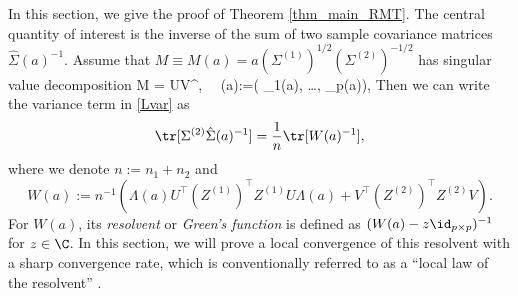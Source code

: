 \documentclass[aos,preprint]{imsart}
\begin{document}
In this section, we give the proof of Theorem \ref{thm_main_RMT}. The central quantity of interest is the inverse of the sum of two sample covariance matrices $\hat \Sigma(a)^{-1}$. Assume that $M\equiv M(a)=a(\Sigma^{(1)})^{1/2}(\Sigma^{(2)})^{-1/2}$ has singular value decomposition
\be\label{eigen2}
M = U\Lambda V^\top, \quad {} \ \ \Lambda\equiv \Lambda (a):=( \lambda_1(a), \ldots, \lambda_p(a)),
\ee 
Then we can write the variance term in \eqref{Lvar} as
\begin{align}\label{eigen2extra}
\tr[\Sigma^{(2)} \hat{\Sigma}(a)^{-1}]= \frac1n \tr[W(a)^{-1}],
\end{align}
where we denote $n:=n_1+n_2$ and
$$ W(a):=n^{-1}\left( \Lambda(a) U^\top (Z^{(1)})^\top Z^{(1)} U\Lambda(a)  + V^\top (Z^{(2)})^\top Z^{(2)}V\right).$$
For $W(a)$, its \emph{resolvent} or \emph{Green's function} is defined as $(W(a) - z\id_{p\times p})^{-1}$ for $z\in \C$.
In this section, we will prove a local convergence of this resolvent with a sharp convergence rate, which is conventionally referred to as a ``local law of the resolvent''  \cite{isotropic,erdos2017dynamical,Anisotropic}.
\end{document}
